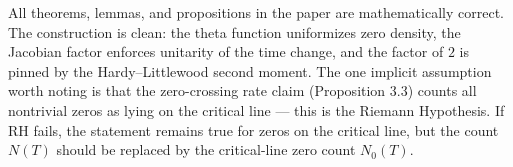 All theorems, lemmas, and propositions in the paper are mathematically correct. The construction is clean: the theta function uniformizes zero density, the Jacobian factor enforces unitarity of the time change, and the factor of \(2\) is pinned by the Hardy–Littlewood second moment. The one implicit assumption worth noting is that the zero-crossing rate claim (Proposition 3.3) counts all nontrivial zeros as lying on the critical line — this is the Riemann Hypothesis. If RH fails, the statement remains true for zeros on the critical line, but the count \(N(T)\) should be replaced by the critical-line zero count \(N_0(T)\).
